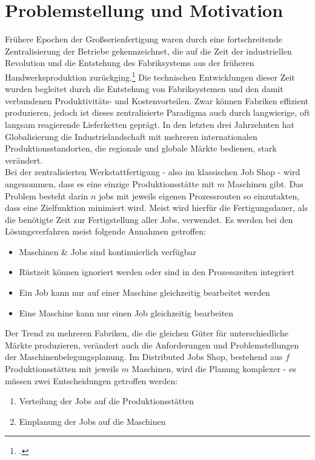 \documentclass[final, english, ngerman, a4paper, 12pt, %
numbers=noenddot,
cd=true,
cdfont=false,cdfont=nohead,cdfont=nodin,
cdmath=false,
cdhead=false,
cdfoot=true,
cdcover=monochrome,
cdgeometry=symmetric,
declaration=heading,
declaration=notoc,
abstract=heading,
]{tudscrreprt}
\begin{document}
\chapter{Problemstellung und Motivation}

Frühere Epochen der Großserienfertigung waren durch eine fortschreitende Zentralisierung der Betriebe gekennzeichnet, die auf die Zeit der industriellen Revolution und die Entstehung des Fabriksystems aus der früheren Handwerksproduktion zurückging.\footcite[Vgl.][S. 135f]{babbage-economy} Die technischen Entwicklungen dieser Zeit wurden begleitet durch die Entstehung von Fabriksystemen und den damit verbundenen Produktivitäts- und Kostenvorteilen. Zwar können Fabriken effizient produzieren, jedoch ist dieses zentralisierte Paradigma auch durch langwierige, oft langsam reagierende Lieferketten geprägt. In den letzten drei Jahrzehnten hat Globalisierung die Industrielandschaft mit mehreren internationalen Produktionsstandorten, die regionale und globale Märkte bedienen, stark verändert. \\

Bei der zentralisierten Werkstattfertigung - also im klassischen Job Shop - wird angenommen, dass es eine einzige Produktionsstätte mit $m$ Maschinen gibt. Das Problem besteht darin $n$ jobs mit jeweils eigenen Prozessrouten so einzutakten, dass eine Zielfunktion minimiert wird. Meist wird hierfür die Fertigungsdauer, als die benötigte Zeit zur Fertigstellung aller Jobs, verwendet. Es werden bei den Lösungsverfahren meist folgende Annahmen getroffen:

\begin{itemize}
	\item Maschinen \& Jobs sind kontinuierlich verfügbar
	\item Rüstzeit können ignoriert werden oder sind in den Prozesszeiten integriert
	\item Ein Job kann nur auf einer Maschine gleichzeitig bearbeitet werden
	\item Eine Maschine kann nur einen Job gleichzeitig bearbeiten
\end{itemize}

Der Trend zu mehreren Fabriken, die die gleichen Güter für unterschiedliche Märkte produzieren, verändert auch die Anforderungen und Problemstellungen der Maschinenbelegungsplanung. Im Distributed Jobs Shop, bestehend aus $f$ Produktionsstätten mit jeweils $m$ Maschinen, wird die Planung komplexer - es müssen zwei Entscheidungen getroffen werden:

\begin{enumerate}
	\item Verteilung der Jobs auf die Produktionsstätten 
	\item Einplanung der Jobs auf die Maschinen
\end{enumerate}
\end{document}
